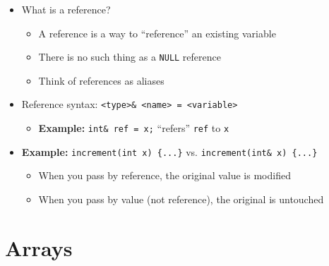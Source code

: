 \documentclass{article}
\begin{document}
\begin{itemize}
	\item What is a reference?
	\begin{itemize}
		\item A reference is a way to ``reference'' an existing variable
		\item There is no such thing as a \texttt{NULL} reference
		\item Think of references as aliases
	\end{itemize}
	\item Reference syntax: \texttt{<type>\& <name> = <variable>}
	\begin{itemize}
		\item \textbf{Example:} \texttt{int\& ref = x;} ``refers'' \texttt{ref} to \texttt{x}
	\end{itemize}
	
	\item\textbf{Example:} \texttt{increment(int x) \{...\}} vs. \texttt{increment(int\& x) \{...\}}
	\begin{itemize}
		\item When you pass by reference, the original value is modified
		\item When you pass by value (not reference), the original is untouched
	\end{itemize}
\end{itemize}

\section{Arrays}
\end{document}
